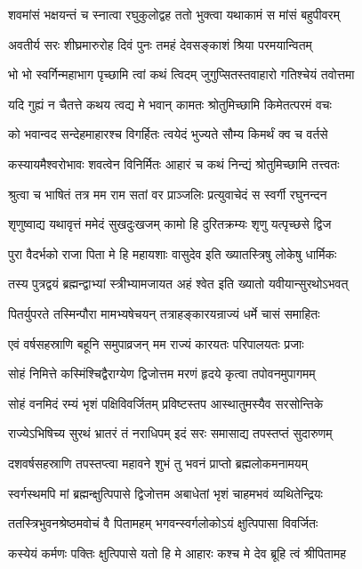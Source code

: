 \twolineshloka
{शवमांसं भक्षयन्तं च स्नात्वा रघुकुलोद्वह}
{ततो भुक्त्वा यथाकामं स मांसं बहुपीवरम्}%

\twolineshloka
{अवतीर्य सरः शीघ्रमारुरोह दिवं पुनः}
{तमहं देवसङ्काशं श्रिया परमयान्वितम्}%

\twolineshloka
{भो भो स्वर्गिन्महाभाग पृच्छामि त्वां कथं त्विदम्}
{जुगुप्सितस्तवाहारो गतिश्चेयं तवोत्तमा}%

\twolineshloka
{यदि गुह्यं न चैतत्ते कथय त्वद्य मे भवान्}
{कामतः श्रोतुमिच्छामि किमेतत्परमं वचः}%

\twolineshloka
{को भवान्वद सन्देहमाहारश्च विगर्हितः}
{त्वयेदं भुज्यते सौम्य किमर्थं क्व च वर्तसे}%

\twolineshloka
{कस्यायमैश्वरोभावः शवत्वेन विनिर्मितः}
{आहारं च कथं निन्द्यं श्रोतुमिच्छामि तत्त्वतः}%

\twolineshloka
{श्रुत्वा च भाषितं तत्र मम राम सतां वर}
{प्राञ्जलिः प्रत्युवाचेदं स स्वर्गी रघुनन्दन}%

\twolineshloka
{शृणुष्वाद्य यथावृत्तं ममेदं सुखदुःखजम्}
{कामो हि दुरितक्रम्यः शृणु यत्पृच्छसे द्विज}%

\twolineshloka
{पुरा वैदर्भको राजा पिता मे हि महायशाः}
{वासुदेव इति ख्यातस्त्रिषु लोकेषु धार्मिकः}%

\twolineshloka
{तस्य पुत्रद्वयं ब्रह्मन्द्वाभ्यां स्त्रीभ्यामजायत}
{अहं श्वेत इति ख्यातो यवीयान्सुरथोऽभवत्}%

\twolineshloka
{पितर्युपरते तस्मिन्पौरा मामभ्यषेचयन्}
{तत्राहङ्कारयन्राज्यं धर्मे चासं समाहितः}%

\twolineshloka
{एवं वर्षसहस्राणि बहूनि समुपाव्रजन्}
{मम राज्यं कारयतः परिपालयतः प्रजाः}%

\twolineshloka
{सोहं निमित्ते कस्मिंश्चिद्वैराग्येण द्विजोत्तम}
{मरणं हृदये कृत्वा तपोवनमुपागमम्}%

\twolineshloka
{सोहं वनमिदं रम्यं भृशं पक्षिविवर्जितम्}
{प्रविष्टस्तप आस्थातुमस्यैव सरसोन्तिके}%

\twolineshloka
{राज्येऽभिषिच्य सुरथं भ्रातरं तं नराधिपम्}
{इदं सरः समासाद्य तपस्तप्तं सुदारुणम्}%

\twolineshloka
{दशवर्षसहस्राणि तपस्तप्त्वा महावने}
{शुभं तु भवनं प्राप्तो ब्रह्मलोकमनामयम्}%

\twolineshloka
{स्वर्गस्थमपि मां ब्रह्मन्क्षुत्पिपासे द्विजोत्तम}
{अबाधेतां भृशं चाहमभवं व्यथितेन्द्रियः}%

\twolineshloka
{ततस्त्रिभुवनश्रेष्ठमवोचं वै पितामहम्}
{भगवन्स्वर्गलोकोऽयं क्षुत्पिपासा विवर्जितः}%

\twolineshloka
{कस्येयं कर्मणः पक्तिः क्षुत्पिपासे यतो हि मे}
{आहारः कश्च मे देव ब्रूहि त्वं श्रीपितामह}%

